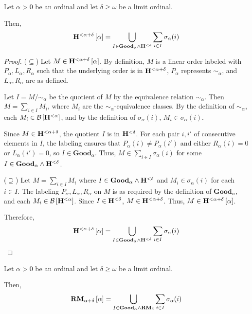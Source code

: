 \begin{lemma}\label{ho-decomposition-single-ordinal}
  Let $\alpha > 0$ be an ordinal
  and let $\delta \ge \omega$ be a limit ordinal.

  Then,
  \[
    \mathbf{H}^{< \alpha + \delta} \left[ {\alpha} \right] = \bigcup_{I \in \mathbf{Good}_{\alpha} \wedge \mathbf{H}^{< \delta}} \sum_{i \in I} \sigma_{\alpha}(i)
  \]

\end{lemma}

\begin{proof}
  ($\subseteq$) Let $M \in \mathbf{H}^{< \alpha + \delta} \left[ {\alpha} \right]$. By definition, $M$
  is a linear order labeled with $P_\alpha, L_\alpha, R_\alpha$ such that the
  underlying order is in $\mathbf{H}^{< \alpha + \delta}$, $P_\alpha$ represents
  $\sim_\alpha$, and $L_\alpha, R_\alpha$ are as defined.

  Let $I = M / \sim_\alpha$ be the quotient of $M$ by the equivalence relation
  $\sim_\alpha$. Then $M = \sum_{i \in I} M_i$, where $M_i$ are the
  $\sim_\alpha$-equivalence classes. By the definition of $\sim_\alpha$, each
  $M_i \in \mathcal{B} \left[ {\mathbf{H}^{< \alpha}} \right]$, and by the definition of $\sigma_\alpha(i)$,
  $M_i \in \sigma_\alpha(i)$.

  Since $M \in \mathbf{H}^{< \alpha + \delta}$, the quotient $I$ is in $\mathbf{H}^{< \delta}$.
  For each pair $i, i'$ of consecutive elements in $I$, the labeling ensures that
  $P_\alpha(i) \ne P_\alpha(i')$ and either $R_\alpha(i) = 0$ or $L_\alpha(i') = 0$,
  so $I \in \mathbf{Good}_\alpha$. Thus, $M \in \sum_{i \in I} \sigma_\alpha(i)$ for
  some $I \in \mathbf{Good}_\alpha \wedge \mathbf{H}^{< \delta}$.

  ($\supseteq$) Let $M = \sum_{i \in I} M_i$ where $I \in \mathbf{Good}_\alpha
    \wedge \mathbf{H}^{< \delta}$ and $M_i \in \sigma_\alpha(i)$ for each $i \in I$. The
  labeling $P_\alpha, L_\alpha, R_\alpha$ on $M$ is as required by the definition
  of $\mathbf{Good}_\alpha$, and each $M_i \in \mathcal{B} \left[ {\mathbf{H}^{< \alpha}} \right]$. Since
  $I \in \mathbf{H}^{< \delta}$, $M \in \mathbf{H}^{< \alpha + \delta}$. Thus,
  $M \in \mathbf{H}^{< \alpha + \delta} \left[ {\alpha} \right]$.

  Therefore,
  \[
    \mathbf{H}^{< \alpha + \delta} \left[ {\alpha} \right] =
    \bigcup_{I \in \mathbf{Good}_{\alpha} \wedge \mathbf{H}^{< \delta}}
    \sum_{i \in I} \sigma_{\alpha}(i)
  \]
\end{proof}

\begin{corollary}\label{rmj-decomposition-single-ordinal}
  Let $\alpha > 0$ be an ordinal
  and let $\delta \ge \omega$ be a limit ordinal.

  Then,
  \[
    \mathbf{RM}_{\alpha + \delta} \left[ {\alpha} \right] = \bigcup_{I \in \mathbf{Good}_{\alpha} \wedge \mathbf{RM}_{\delta}}
    \sum_{i \in I} \sigma_{\alpha}(i)
  \]
\end{corollary}

